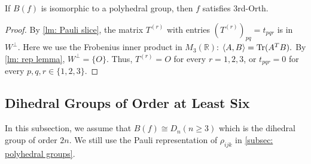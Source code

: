 \begin{lemma}\label{lm: arity 6 polyhedral group 3rd orth}
    If $B(f)$ is isomorphic to a polyhedral group, then $f$ satisfies {\sc 3rd-Orth}.
\end{lemma}
\begin{proof}
    By \cref{lm: Pauli slice}, the matrix $T^{(r)}$ with entries $(T^{(r)})_{pq}=t_{pqr}$ is in $W^{\perp}$. 
    Here we use the Frobenius inner product in $M_3(\mathbb{R})$: $\braket{A,B}=\mathrm{Tr}(A^TB).$
    By \cref{lm: rep lemma}, $W^\perp=\{O\}.$ 
    Thus, $T^{(r)}=O$ for every $r=1,2,3$, or $t_{pqr}=0$ for every $p,q,r\in\{1,2,3\}.$
\end{proof}

\subsection{Dihedral Groups of Order at Least Six}\label{subsec: dihedral group}
In this subsection, we assume that $B(f)\cong D_n(n\ge 3)$ which is the dihedral group of order $2n.$
We still use the Pauli representation of $\rho_{ijk}$ in \cref{subsec: polyhedral groups}.

